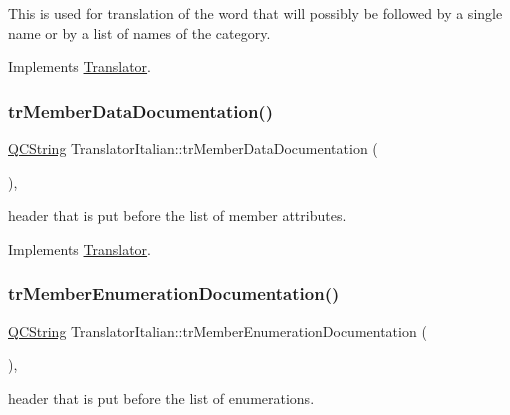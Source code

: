 This is used for translation of the word that will possibly be followed by a single name or by a list of names of the category. 

Implements \mbox{\hyperlink{class_translator}{Translator}}.

\mbox{\label{class_translator_italian_a4afcca626ade00f54d0d799937be8354}} 
\subsubsection{\texorpdfstring{trMemberDataDocumentation()}{trMemberDataDocumentation()}}
{\footnotesize\ttfamily \mbox{\hyperlink{class_q_c_string}{Q\+C\+String}} Translator\+Italian\+::tr\+Member\+Data\+Documentation (\begin{DoxyParamCaption}{ }\end{DoxyParamCaption})\hspace{0.3cm}{\ttfamily [inline]}, {\ttfamily [virtual]}}

header that is put before the list of member attributes. 

Implements \mbox{\hyperlink{class_translator}{Translator}}.

\mbox{\label{class_translator_italian_a3063e66759faae2f04fe8fe8a8790942}} 
\subsubsection{\texorpdfstring{trMemberEnumerationDocumentation()}{trMemberEnumerationDocumentation()}}
{\footnotesize\ttfamily \mbox{\hyperlink{class_q_c_string}{Q\+C\+String}} Translator\+Italian\+::tr\+Member\+Enumeration\+Documentation (\begin{DoxyParamCaption}{ }\end{DoxyParamCaption})\hspace{0.3cm}{\ttfamily [inline]}, {\ttfamily [virtual]}}

header that is put before the list of enumerations. 

